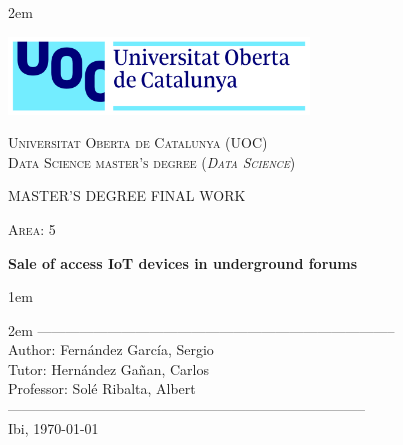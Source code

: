 \newpage
\thispagestyle{empty}

\baselineskip 2em


\centerline{\includegraphics[width=0.6\textwidth]{images/UOC-logo}}
\begin{center}
\textsc{Universitat Oberta de Catalunya (UOC) \\
Data Science master's degree (\textit{Data Science})\\}


\vspace*{1.5cm}

\textsc{\Large MASTER'S DEGREE FINAL WORK}

\vspace*{0.5cm}

\textsc{\large Area: 5}



\vspace*{2.0cm}

\textbf{\Large Sale of access IoT devices in underground forums}

\vspace{2.5cm}
\baselineskip 1em

\baselineskip 2em
-----------------------------------------------------------------------------\\
Author:     Fernández García, Sergio\\
Tutor:      Hernández Gañan, Carlos\\
Professor:  Solé Ribalta, Albert\\
-----------------------------------------------------------------------------\\
\vspace*{1.5cm}
Ibi, \today

\end{center}

\newpage
\pagestyle{empty}
\hfill
